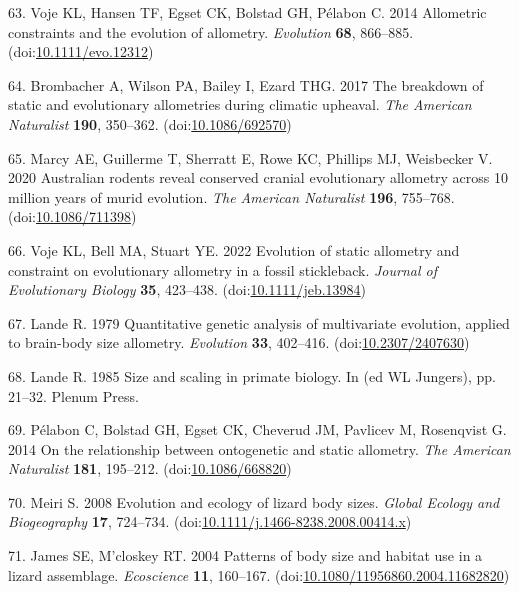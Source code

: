 \documentclass[
  11pt,
]{article}
\begin{document}
\leavevmode\hypertarget{ref-Voje2014}{}%
63. Voje KL, Hansen TF, Egset CK, Bolstad GH, Pélabon C. 2014 Allometric
constraints and the evolution of allometry. \emph{Evolution}
\textbf{68}, 866--885.
(doi:\href{https://doi.org/10.1111/evo.12312}{10.1111/evo.12312})

\leavevmode\hypertarget{ref-Brombacher2017}{}%
64. Brombacher A, Wilson PA, Bailey I, Ezard THG. 2017 The breakdown of
static and evolutionary allometries during climatic upheaval. \emph{The
American Naturalist} \textbf{190}, 350--362.
(doi:\href{https://doi.org/10.1086/692570}{10.1086/692570})

\leavevmode\hypertarget{ref-Marcy2020}{}%
65. Marcy AE, Guillerme T, Sherratt E, Rowe KC, Phillips MJ, Weisbecker
V. 2020 Australian rodents reveal conserved cranial evolutionary
allometry across 10 million years of murid evolution. \emph{The American
Naturalist} \textbf{196}, 755--768.
(doi:\href{https://doi.org/10.1086/711398}{10.1086/711398})

\leavevmode\hypertarget{ref-Voje2022}{}%
66. Voje KL, Bell MA, Stuart YE. 2022 Evolution of static allometry and
constraint on evolutionary allometry in a fossil stickleback.
\emph{Journal of Evolutionary Biology} \textbf{35}, 423--438.
(doi:\href{https://doi.org/10.1111/jeb.13984}{10.1111/jeb.13984})

\leavevmode\hypertarget{ref-Lande1979}{}%
67. Lande R. 1979 Quantitative genetic analysis of multivariate
evolution, applied to brain-body size allometry. \emph{Evolution}
\textbf{33}, 402--416.
(doi:\href{https://doi.org/10.2307/2407630}{10.2307/2407630})

\leavevmode\hypertarget{ref-Lande1985}{}%
68. Lande R. 1985 Size and scaling in primate biology. In (ed WL
Jungers), pp. 21--32. Plenum Press.

\leavevmode\hypertarget{ref-Pelabon2014}{}%
69. Pélabon C, Bolstad GH, Egset CK, Cheverud JM, Pavlicev M, Rosenqvist
G. 2014 On the relationship between ontogenetic and static allometry.
\emph{The American Naturalist} \textbf{181}, 195--212.
(doi:\href{https://doi.org/10.1086/668820}{10.1086/668820})

\leavevmode\hypertarget{ref-Meiri2008}{}%
70. Meiri S. 2008 Evolution and ecology of lizard body sizes.
\emph{Global Ecology and Biogeography} \textbf{17}, 724--734.
(doi:\href{https://doi.org/10.1111/j.1466-8238.2008.00414.x}{10.1111/j.1466-8238.2008.00414.x})

\leavevmode\hypertarget{ref-James2004}{}%
71. James SE, M'closkey RT. 2004 Patterns of body size and habitat use
in a lizard assemblage. \emph{Ecoscience} \textbf{11}, 160--167.
(doi:\href{https://doi.org/10.1080/11956860.2004.11682820}{10.1080/11956860.2004.11682820})
\end{document}
